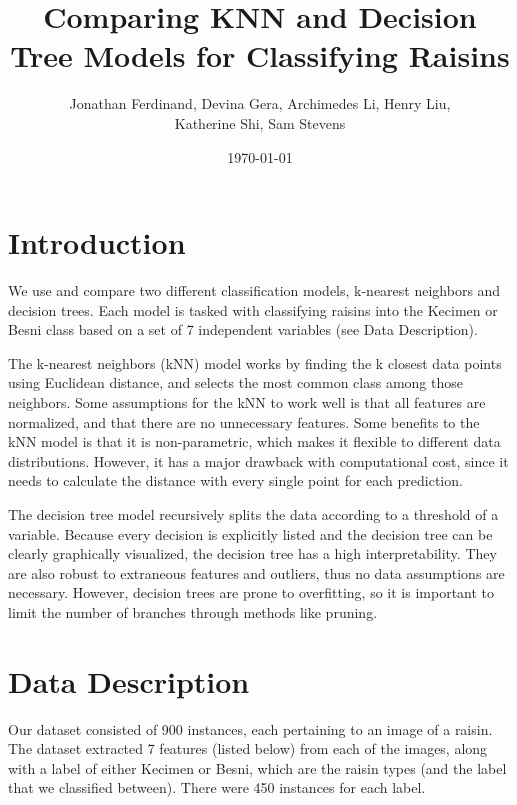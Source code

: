 \documentclass{article}
\title{Comparing KNN and Decision Tree Models for Classifying Raisins}
\author{Jonathan Ferdinand, Devina Gera, Archimedes Li, Henry Liu, \\Katherine Shi, Sam Stevens}
\date{\today}
\begin{document}
\maketitle

\section*{Introduction}

We use and compare two different classification models, k-nearest neighbors and decision trees.  Each model is tasked with classifying raisins into the Kecimen or Besni class based on a set of 7 independent variables (see Data Description).

\vspace{5mm}

\noindent The k-nearest neighbors (kNN) model works by finding the k closest data points using Euclidean distance, and selects the most common class among those neighbors.  Some assumptions for the kNN to work well is that all features are normalized, and that there are no unnecessary features.  Some benefits to the kNN model is that it is non-parametric, which makes it flexible to different data distributions.  However, it has a major drawback with computational cost, since it needs to calculate the distance with every single point for each prediction.

\vspace{5mm}

\noindent The decision tree model recursively splits the data according to a threshold of a variable.  Because every decision is explicitly listed and the decision tree can be clearly graphically visualized, the decision tree has a high interpretability.  They are also robust to extraneous features and outliers, thus no data assumptions are necessary.  However, decision trees are prone to overfitting, so it is important to limit the number of branches through methods like pruning.


\section*{Data Description}
Our dataset consisted of 900 instances, each pertaining to an image of a raisin. The dataset extracted 7 features (listed below) from each of the images, along with a label of either Kecimen or Besni, which are the raisin types (and the label that we classified between). There were 450 instances for each label.
\end{document}
